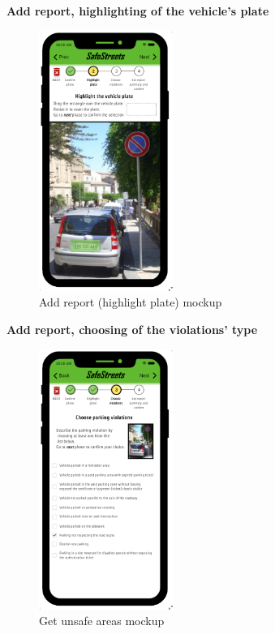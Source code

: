 					\begin{center}
						{\small \textbf{Add report, highlighting of the vehicle's plate}}
					\end{center}
					\vspace{-5mm}
					\begin{figure}[!h]
						\centering
						\includegraphics[height=8.5cm]{images/MockUp/User/Report2HighlightPlate.pdf}
						\caption{Add report (highlight plate) mockup}
					\end{figure}
					\vspace{-1mm}
					\begin{center}
						{\small \textbf{Add report, choosing of the violations' type}}
					\end{center}
					\vspace{-5mm}
					\begin{figure}[!h]
						\centering
						\includegraphics[height=8.5cm]{images/MockUp/User/Report3ChooseViolation.pdf}
						\caption{Get unsafe areas mockup}
					\end{figure}
					\clearpage
					
